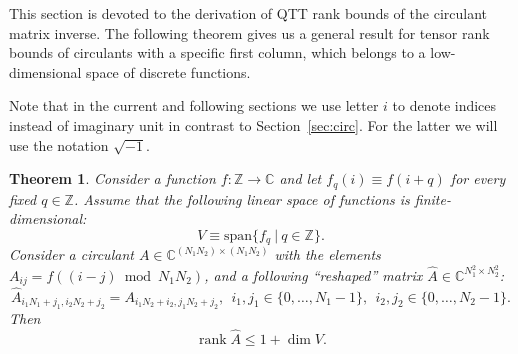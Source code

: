 \documentclass[a4paper]{article}
\newtheorem{theorem}{Theorem}[section]
\DeclareMathOperator{\rank}{rank}
\begin{document}
This section is devoted to the derivation of QTT rank bounds of the circulant  matrix inverse.
The following theorem gives us a general result for tensor rank bounds of circulants with a specific first column, which belongs to a low-dimensional space of discrete functions.
%

Note that in the current and following sections we use letter $i$ to denote indices instead of  imaginary unit in contrast to Section~\ref{sec:circ}. 
For the latter we will use the notation $\sqrt{-1}$.

	\begin{theorem}\label{thm:qtt-rank-general}
		Consider a function $f: \mathbb{Z} \to \mathbb{C}$ and let $f_q(i) \equiv f(i+q)$ for every fixed $q \in \mathbb{Z}$.
 		Assume that the following linear space of functions is finite-dimensional:
		\[
		V \equiv \mathrm{span}\{f_q~|~q \in \mathbb{Z}\}.
		\]
		Consider a circulant $A \in \mathbb{C}^{(N_1N_2) \times (N_1N_2)}$ with the elements $A_{ij} = f((i-j) \bmod N_1N_2)$, and a following ``reshaped'' matrix $\widehat{A} \in \mathbb{C}^{N_1^2 \times N_2^2}$:
		\[
		\widehat{A}_{i_1N_1 + j_1, i_2N_2 + j_2} = A_{i_1N_2 + i_2,j_1N_2 + j_2},~~ i_1, j_1 \in \{0, \dots, N_1-1\},~~i_2, j_2 \in \{0, \dots, N_2-1\}.
		\]
		Then
		\[
		\rank \widehat{A} \le 1 + \dim V.
		\]
	\end{theorem}
%
\end{document}

